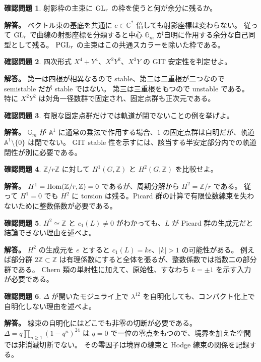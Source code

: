 \documentclass[dvipdfmx,a4paper,11pt]{article}
\theoremstyle{definition}
\newtheorem{ques}{確認問題}[section]
\newcommand{\C}{\mathbb C}\newcommand{\R}{\mathbb R}\newcommand{\Z}{\mathbb Z}\newcommand{\Q}{\mathbb Q}
\newcommand{\A}{\mathbb A}
\begin{document}
\begin{ques}
射影枠の主束に $\operatorname{GL}_r$ の枠を使うと何が余分に残るか。
\end{ques}
\textbf{解答。}
ベクトル束の基底を共通に $c\in\C^*$ 倍しても射影座標は変わらない。
従って $\operatorname{GL}_r$ で曲線の射影座標を分類すると中心 $\mathbb G_m$ が自明に作用する余分な自己同型として残る。
$\operatorname{PGL}_r$ の主束はこの共通スカラーを除いた枠である。

\begin{ques}
四次形式 $X^4+Y^4$、$X^2Y^2$、$X^3Y$ の GIT 安定性を判定せよ。
\end{ques}
\textbf{解答。}
第一は四根が相異なるので stable、第二は二重根が二つなので semistable だが stable ではない。
第三は三重根をもつので unstable である。
特に $X^2Y^2$ は対角一径数群で固定され、固定点群も正次元である。

\begin{ques}
有限な固定点群だけでは軌道が閉でないことの例を挙げよ。
\end{ques}
\textbf{解答。}
$\mathbb G_m$ が $\A^1$ に通常の乗法で作用する場合、$1$ の固定点群は自明だが、軌道 $\A^1\setminus\{0\}$ は閉でない。
GIT stable 性を示すには、該当する半安定部分内での軌道閉性が別に必要である。

\begin{ques}
$\Z/r\Z$ に対して $H^1(G,\Z)$ と $H^2(G,\Z)$ を比較せよ。
\end{ques}
\textbf{解答。}
$H^1=\Hom(\Z/r,\Z)=0$ であるが、周期分解から $H^2=\Z/r$ である。
従って $H^1=0$ でも $H^2$ に torsion は残る。Picard 群の計算で有限位数線束を失わないために整数係数が必要である。

\begin{ques}
$H^2\simeq\Z$ と $c_1(L)\neq0$ がわかっても、$L$ が Picard 群の生成元だと結論できない理由を述べよ。
\end{ques}
\textbf{解答。}
$H^2$ の生成元を $e$ とすると $c_1(L)=ke$、$|k|>1$ の可能性がある。
例えば部分群 $2\Z\subset\Z$ は有理係数にすると全体を張るが、整数係数では指数二の部分群である。
Chern 類の単射性に加えて、原始性、すなわち $k=\pm1$ を示す入力が必要である。

\begin{ques}
$\Delta$ が開いたモジュライ上で $\lambda^{12}$ を自明化しても、コンパクト化上で自明化しない理由を述べよ。
\end{ques}
\textbf{解答。}
線束の自明化にはどこでも非零の切断が必要である。
$\Delta=q\prod_{n\ge1}(1-q^n)^{24}$ は $q=0$ で一位の零点をもつので、境界を加えた空間では非消滅切断でない。
その零因子は境界の線束と Hodge 線束の関係を記録する。
\end{document}
